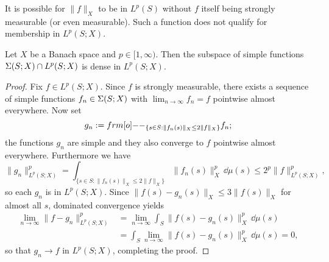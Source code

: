 \begin{rmk}
  It is possible for $\|f\|_X$ to be in $L^p(S)$ without $f$ itself being strongly measurable (or even measurable).
  Such a function does not qualify for membership in $L^p(S;X)$.
\end{rmk}


\begin{prop}
  Let $X$ be a Banach space and $p \in [1,\infty)$.
  Then the subspace of simple functions $\Sigma(S;X) \cap L^p(S;X)$ is dense in $L^p(S;X)$.
\end{prop}

\begin{proof}

  Fix $f \in L^p(S;X)$.
  Since $f$ is strongly measurable, there exists a sequence of simple functions $f_n \in \Sigma(S;X)$ with $\lim_{n \to \infty} f_n = f$ pointwise almost everywhere.
  Now set
  \begin{equation*}
    g_n := \1_{ \{s \in S : \|f_n(s)\|_X \leq 2\|f\|_X \} } f_n;
  \end{equation*}
  the functions $g_n$ are simple and they also converge to $f$ pointwise almost everywhere.
  Furthermore we have
  \begin{equation*}
    \|g_n\|_{L^p(S;X)}^p = \int_{\{s \in S : \|f_n(s)\|_X \leq 2\|f\|_X \} } \|f_n(s)\|_X^p \, \dd\mu(s) \leq 2^p \|f\|_{L^p(S;X)}^p,
  \end{equation*}
  so each $g_n$ is in $L^p(S;X)$.
  Since $\|f(s) - g_n(s)\|_X \leq 3\|f(s)\|_X$ for almost all $s$, dominated convergence yields
  \begin{equation*}
    \begin{aligned}
      \lim_{n \to \infty} \|f - g_n\|_{L^p(S;X)}^p &= \lim_{n \to \infty} \int_S \|f(s) - g_n(s)\|_{X}^p \, \dd\mu(s) \\
      &= \int_S \lim_{n \to \infty}  \|f(s) - g_n(s)\|_{X}^p \, \dd\mu(s) = 0,
    \end{aligned}
  \end{equation*}
  so that $g_n \to f$ in $L^p(S;X)$, completing the proof.
\end{proof}

